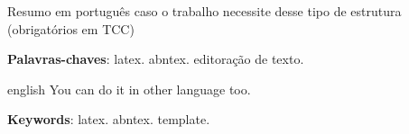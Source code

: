 
\begin{resumo}
  Resumo em português caso o trabalho necessite desse tipo de estrutura (obrigatórios em TCC)

  \vspace{\onelineskip}
  \noindent
  \textbf{Palavras-chaves}: latex. abntex. editoração de texto.
\end{resumo}

\newpage

\begin{resumo}[Abstract]
\begin{otherlanguage*}{english}
  You can do it in other language too.\par

  \vspace{\onelineskip}
  \noindent

  \textbf{Keywords}: latex. abntex. template.
\end{otherlanguage*}
\end{resumo}
